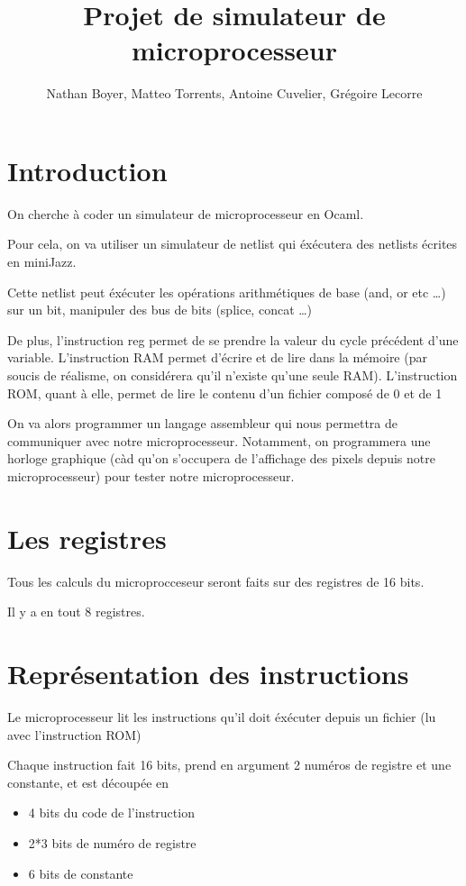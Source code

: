 \documentclass[12pt,a4paper,french]{article}
\title{Projet de simulateur de microprocesseur}
\author{Nathan Boyer, Matteo Torrents, Antoine Cuvelier, Grégoire Lecorre}
\begin{document}
\maketitle

\section*{Introduction}

On cherche à coder un simulateur de microprocesseur en Ocaml.

Pour cela, on va utiliser un simulateur de netlist qui éxécutera des netlists écrites en miniJazz.

Cette netlist peut éxécuter les opérations arithmétiques de base (and, or etc \ldots) sur un bit, manipuler des bus de bits (splice, concat \ldots)

De plus, l'instruction reg permet de se prendre la valeur du cycle précédent d'une variable. L'instruction RAM permet d'écrire et de lire dans la mémoire
(par soucis de réalisme, on considérera qu'il n'existe qu'une seule RAM). L'instruction ROM, quant à elle, permet de lire le contenu d'un fichier composé de 0 et de 1

On va alors programmer un langage assembleur qui nous permettra de communiquer avec notre microprocesseur. Notamment, on programmera une horloge graphique (càd qu'on s'occupera
de l'affichage des pixels depuis notre microprocesseur)
pour tester notre microprocesseur.


\section{Les registres}

Tous les calculs du microprocceseur seront faits sur des registres de 16 bits.

Il y a en tout 8 registres.


\section{Représentation des instructions}

Le microprocesseur lit les instructions qu'il doit éxécuter depuis un fichier (lu avec l'instruction ROM)

Chaque instruction fait 16 bits, prend en argument 2 numéros de registre et une constante, et est découpée en

\begin{itemize}
    \item 4 bits du code de l'instruction
    \item 2*3 bits de numéro de registre
    \item 6 bits de constante
\end{itemize}
\end{document}
